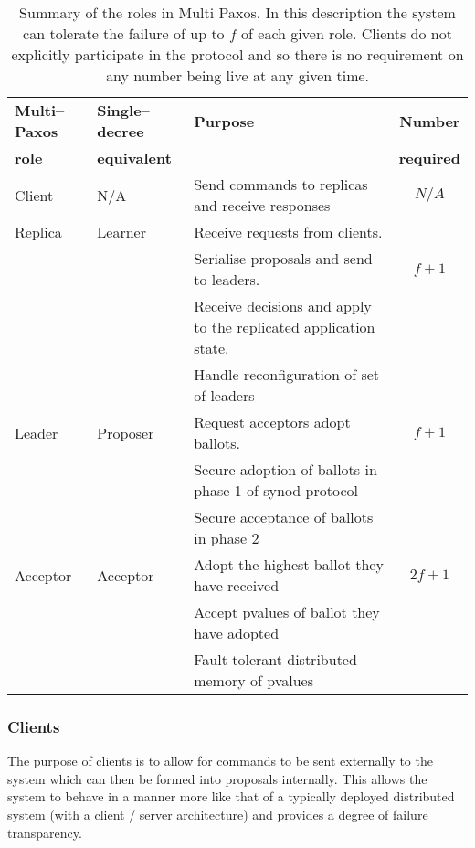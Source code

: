 \begin{table}
\centering
\begin{tabular}{l  | l | p{6cm} | c }
   \textbf{Multi--Paxos} & \textbf{Single--decree} & \textbf{Purpose} & \textbf{Number} \\
   \textbf{role} & \textbf{equivalent} & & \textbf{required} \\
    \hline
   Client & N/A & Send commands to replicas and receive responses & $ N/A $ \\ \hline
  
   Replica & Learner & Receive requests from clients. &  \\
                 & & Serialise proposals and send to leaders. & $f + 1$ \\
                 & & Receive decisions and apply to the replicated application state. & \\
                 & & Handle reconfiguration of set of leaders & \\ \hline
  
  Leader & Proposer & Request acceptors adopt ballots. & $f + 1$ \\
               & & Secure adoption of ballots in phase 1 of synod protocol & \\
               & & Secure acceptance of ballots in phase 2 &  \\ \hline
               
  Acceptor & Acceptor & Adopt the highest ballot they have received & $2f + 1$ \\
                   & & Accept pvalues of ballot they have adopted & \\
                   & & Fault tolerant distributed memory of pvalues &  \\
\end{tabular}
\caption{Summary of the roles in Multi Paxos. In this description the system can tolerate the failure of up to $f$ of each given role. Clients do not explicitly participate in the protocol and so there is no requirement on any number being live at any given time.}
\label{table:multi-role-summary}
\end{table}

\subsubsection{Clients}

The purpose of clients is to allow for commands to be sent externally to the system which can then be formed into proposals internally. This allows the system to behave in a manner more like that of a typically deployed distributed system (with a client / server architecture) and provides a degree of failure transparency. \\

